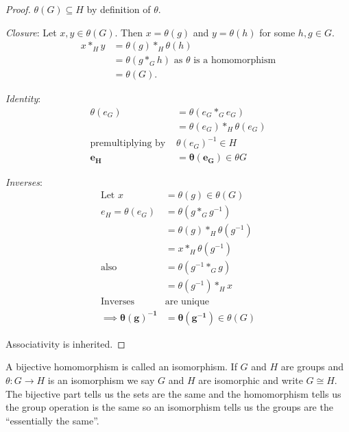 \begin{proof}
\(\theta(G) \subseteq H\) by definition of \(\theta\).

\emph{Closure}: Let \(x, y \in \theta(G)\). Then \(x = \theta(g)\) and \(y = \theta(h)\) for some \(h, g \in G\).
\begin{align*}
    x *_H y &= \theta(g) *_H \theta(h) \\
    &= \theta(g *_G h) \text{ as } \theta \text{ is a homomorphism} \\
    &= \theta(G).
\end{align*}

\emph{Identity}:
\begin{align*}
    \theta(e_G) &= \theta(e_G *_G e_G) \\
    &= \theta(e_G) *_H \theta(e_G) \\
    \text{premultiplying by } &\theta(e_G)^{-1} \in H \\
    \boldsymbol{e_H} &\boldsymbol = \boldsymbol{\theta(e_G)} \in \theta{G}
\end{align*}

\emph{Inverses}:
\begin{align*}
    \text{Let } x &= \theta(g) \in \theta(G) \\
    e_H = \theta(e_G) &= \theta(g *_G g^{-1}) \\
    &= \theta(g) *_H \theta(g^{-1}) \\
    &= x *_H \theta(g^{-1}) \\
    \text{also } \hspace{1cm} &= \theta(g^{-1} *_G g) \\
    &= \theta(g^{-1}) *_H x \\
    \text{Inverses }&\text{are unique} \\
    \implies \boldsymbol{\theta(g)^{-1}} &\boldsymbol{= \theta(g^{-1})} \in \theta(G)
\end{align*}

Associativity is inherited.
\end{proof}

\begin{definition}
A bijective homomorphism is called an isomorphism. If \(G\) and \(H\) are groups and \(\theta : G \to H\) is an isomorphism we say \(G\) and \(H\) are isomorphic and write \(G \cong H\). The bijective part tells us the sets are the same and the homomorphism tells us the group operation is the same so an isomorphism tells us the groups are the ``essentially the same''.
\end{definition}

